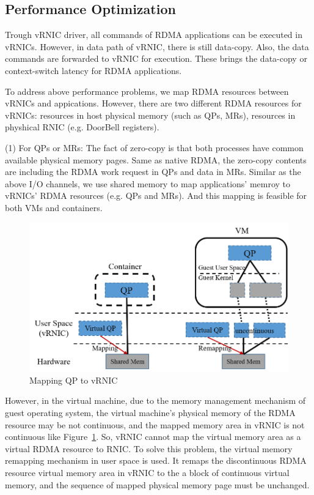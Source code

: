 	
\subsection{Performance Optimization}
Trough vRNIC driver, all commands of RDMA applications can be executed in vRNICs. However, in data path of vRNIC, there is still data-copy. Also, the data commands are forwarded to vRNIC for execution. These brings the data-copy or context-switch latency for RDMA applications. 

To address above performance problems, we map RDMA resources between vRNICs and appications. However, there are two different RDMA resources for vRNICs: resources in host physical memory (such as QPs, MRs), resources in physhical RNIC (e.g. DoorBell registers). 

(1) For QPs or MRs: The fact of zero-copy is that both processes have common available physical memory pages. Same as native RDMA, the zero-copy contents are including the RDMA work request in QPs and data in MRs. 
Similar as the above I/O channels, we use shared memory to map applications' memroy to vRNICs' RDMA resources (e.g. QPs and MRs). And this mapping is feasible for both VMs and containers.

\begin{figure}[!ht]
	\centering
	\includegraphics[width=1.0\linewidth]{images/zero-copy}
	\caption{Mapping QP to vRNIC}
	\label{fig:zero-copy}
\end{figure}

However, in the virtual machine, due to the memory management mechanism of guest operating system, the virtual machine's physical memory of the RDMA resource may be not continuous, and the mapped memory area in vRNIC is not continuous like Figure~\ref{fig:zero-copy}. So, vRNIC cannot map the virtual memory area as a virtual RDMA resource to RNIC. To solve this problem, the virtual memory remapping mechanism in user space is used. It remaps the discontinuous RDMA resource virtual memory area in vRNIC to the a block of continuous virtual memory, and the sequence of mapped physical memory page must be unchanged.

